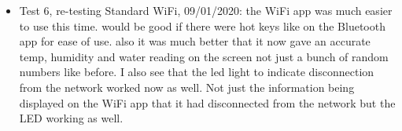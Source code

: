 \documentclass[8pt, a4paper]{article}
\begin{document}
\begin{itemize}
\item Test 6, re-testing Standard WiFi, 09/01/2020: the WiFi app was much easier to use this time. would be good if there were hot keys like on the Bluetooth app for ease of use. also it was much better that it now gave an accurate temp, humidity and water reading on the screen not just a bunch of random numbers like before. I also see that the led light to indicate disconnection from the network worked now as well. Not just the information being displayed on the WiFi app that it had disconnected from the network but the LED working as well.

\end{itemize} 
\end{document}
